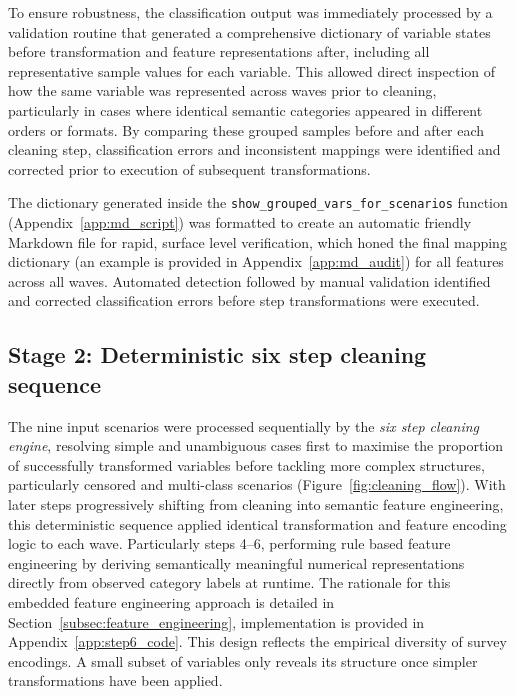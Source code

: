 To ensure robustness, the classification output was immediately processed by a validation routine that generated a comprehensive dictionary of variable states before transformation and feature representations after, including all representative sample values for each variable. This allowed direct inspection of how the same variable was represented across waves prior to cleaning, particularly in cases where identical semantic categories appeared in different orders or formats. By comparing these grouped samples before and after each cleaning step, classification errors and inconsistent mappings were identified and corrected prior to execution of subsequent transformations.

The dictionary generated inside the \texttt{show\_grouped\_vars\_for\_scenarios} function (Appendix~\ref{app:md_script}) was formatted to create an automatic friendly Markdown file for rapid, surface level verification, which honed the final mapping dictionary (an example is provided in Appendix~\ref{app:md_audit}) for all features across all waves. Automated detection followed by manual validation identified and corrected classification errors before step transformations were executed.

\subsection{Stage 2: Deterministic six step cleaning sequence}\label{sc:stage2}
The nine input scenarios were processed sequentially by the \emph{six step cleaning engine}, resolving simple and unambiguous cases first to maximise the proportion of successfully transformed variables before tackling more complex structures, particularly censored and multi-class scenarios (Figure~\ref{fig:cleaning_flow}). With later steps progressively shifting from cleaning into semantic feature engineering, this deterministic sequence applied identical transformation and feature encoding logic to each wave. Particularly steps 4--6, performing rule based feature engineering by deriving semantically meaningful numerical representations directly from observed category labels at runtime. The rationale for this embedded feature engineering approach is detailed in Section~\ref{subsec:feature_engineering}, implementation is provided in Appendix~\ref{app:step6_code}.
This design reflects the empirical diversity of survey encodings. A small subset of variables only reveals its structure once simpler transformations have been applied.

